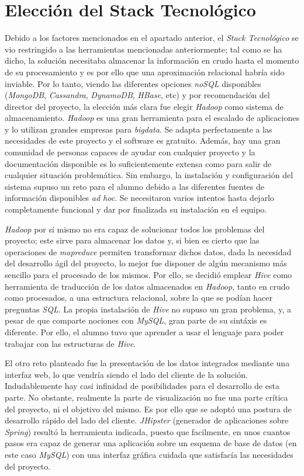 \section{Elección del Stack Tecnológico}  \label{analisis.stack}
Debido a los factores mencionados en el apartado anterior, el \textit{Stack Tecnológico} se vio restringido a las herramientas mencionadas anteriormente; tal como se ha dicho, la solución necesitaba almacenar la información en crudo hasta el momento de su procesamiento y es por ello que una aproximación relacional habría sido inviable. Por lo tanto, viendo las diferentes opciones \textit{noSQL} disponibles (\textit{MongoDB}, \textit{Cassandra}, \textit{DynamoDB}, \textit{HBase}, etc) y por recomendación del director del proyecto, la elección más clara fue elegir \textit{Hadoop} como sistema de almacenamiento. \textit{Hadoop} es una gran herramienta para el escalado de aplicaciones y lo utilizan grandes empresas para \textit{\gls{bigdata}}. Se adapta perfectamente a las necesidades de este proyecto y el software es gratuito. Además, hay una gran comunidad de personas capaces de ayudar con cualquier proyecto y la documentación disponible es lo suficientemente extensa como para salir de cualquier situación problemática. Sin embargo, la instalación y configuración del sistema supuso un reto para el alumno debido a las diferentes fuentes de información disponibles \textit{ad hoc}. Se necesitaron varios intentos hasta dejarlo completamente funcional y dar por finalizada su instalación en el equipo. \par
\textit{Hadoop} por sí mismo no era capaz de solucionar todos los problemas del proyecto; este sirve para almacenar los datos y, si bien es cierto que las operaciones de \textit{\gls{mapreduce}} permiten transformar dichos datos, dada la necesidad del desarrollo ágil del proyecto, lo mejor fue disponer de algún mecanismo más sencillo para el procesado de los mismos. Por ello, se decidió emplear \textit{Hive} como herramienta de traducción de los datos almacenados en \textit{Hadoop}, tanto en crudo como procesados, a una estructura relacional, sobre la que se podían hacer preguntas \textit{SQL}. La propia instalación de \textit{Hive} no supuso un gran problema, y, a pesar de que comparte  nociones con \textit{MySQL}, gran parte de su sintáxis es diferente. Por ello, el alumno tuvo que aprender a usar el lenguaje para poder trabajar con las estructuras de \textit{Hive}.\par
El otro reto planteado fue la presentación de los datos integrados mediante una interfaz web, lo que vendría siendo el lado del cliente de la solución. Indudablemente hay casi infinidad de posibilidades para el desarrollo de esta parte. No obstante, realmente la parte de visualización no fue una parte crítica del proyecto, ni el objetivo del mismo. Es por ello que se adoptó una postura de desarrollo rápido del lado del cliente. \textit{JHipster} (generador de aplicaciones sobre \textit{Spring}) resultó la herramienta indicada, puesto que facilmente, en unos cuantos pasos era capaz de generar una aplicación sobre un esquema de base de datos (en este caso \textit{MySQL}) con una interfaz gráfica cuidada que satisfacía las necesidades del proyecto. 
